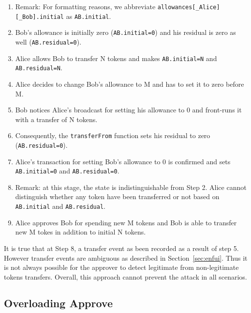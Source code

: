 \begin{enumerate}
	\item Remark: For formatting reasons, we abbreviate \texttt{allowances[\_Alice][\_Bob].initial} as \texttt{AB.initial}.
	\item Bob’s allowance is initially zero (\texttt{AB.initial=0}) and his residual is zero as well (\texttt{AB.residual=0}).
	\item Alice allows Bob to transfer N tokens and makes \texttt{AB.initial=N} and \texttt{AB.residual=N}.
	\item Alice decides to change Bob’s allowance to M and has to set it to zero before M.
	\item Bob notices Alice’s broadcast for setting his allowance to 0 and front-runs it with a transfer of N tokens.
	\item Consequently, the \texttt{transferFrom} function sets his residual to zero (\texttt{AB.residual=0}).
	\item Alice’s transaction for setting Bob's allowance to 0 is confirmed and sets \texttt{AB.initial=0} and \texttt{AB.residual=0}.
	\item Remark: at this stage, the state is indistinguishable from Step 2. Alice cannot distinguish whether any token have been transferred or not based on \texttt{AB.initial} and \texttt{AB.residual}. 
	\item Alice approves Bob for spending new M tokens and Bob is able to transfer new M tokes in addition to initial N tokens.
\end{enumerate}

It is true that at Step 8, a transfer event as been recorded as a result of step 5. However transfer events are ambiguous as described in Section~\ref{sec:enfui}. Thus it is not always possible for the approver to detect legitimate from non-legitimate tokens transfers. Overall, this approach cannot prevent the attack in all scenarios. 


\subsection{Overloading Approve}
\label{sec:overload}


